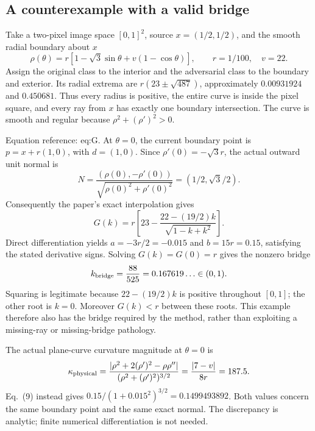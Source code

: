 \documentclass[10pt]{article}
\begin{document}
\subsection*{A counterexample with a valid bridge}
Take a two-pixel image space \([0,1]^2\), source \(x=(1/2,1/2)\), and the smooth radial boundary about \(x\) \[\rho(\theta)=r[1-\sqrt3\sin\theta+v(1-\cos\theta)],
\qquad r=1/100,\quad v=22.\] Assign the original class to the interior and the adversarial class to the boundary and exterior. Its radial extrema are \(r(23\pm\sqrt{487})\), approximately \(0.00931924\) and \(0.450681\). Thus every radius is positive, the entire curve is inside the pixel square, and every ray from \(x\) has exactly one boundary intersection. The curve is smooth and regular because \(\rho^2+(\rho')^2>0\).\par
Equation reference: eq:G. At \(\theta=0\), the current boundary point is \(p=x+r(1,0)\), with \(d=(1,0)\). Since \(\rho'(0)=-\sqrt3 r\), the actual outward unit normal is \[N=\frac{(\rho(0),-\rho'(0))}{\sqrt{\rho(0)^2+\rho'(0)^2}}=(1/2,\sqrt3/2).\] Consequently the paper’s exact interpolation gives \[
G(k)=r\left[23-\frac{22-(19/2)k}{\sqrt{1-k+k^2}}\right].\] Direct differentiation yields \(a=-3r/2=-0.015\) and \(b=15r=0.15\), satisfying the stated derivative signs. Solving \(G(k)=G(0)=r\) gives the nonzero bridge \[k_{\rm bridge}=\frac{88}{525}=0.167619\ldots\in(0,1).\] Squaring is legitimate because \(22-(19/2)k\) is positive throughout \([0,1]\); the other root is \(k=0\). Moreover \(G(k)<r\) between these roots. This example therefore also has the bridge required by the method, rather than exploiting a missing-ray or missing-bridge pathology.\par
The actual plane-curve curvature magnitude at \(\theta=0\) is \[\kappa_{\rm physical}=
\frac{|\rho^2+2(\rho')^2-\rho\rho''|}
 {(\rho^2+(\rho')^2)^{3/2}}
=\frac{|7-v|}{8r}=187.5.\] Eq. (9) instead gives \(0.15/(1+0.015^2)^{3/2}=0.1499493892\). Both values concern the same boundary point and the same exact normal. The discrepancy is analytic; finite numerical differentiation is not needed.\par
\end{document}
